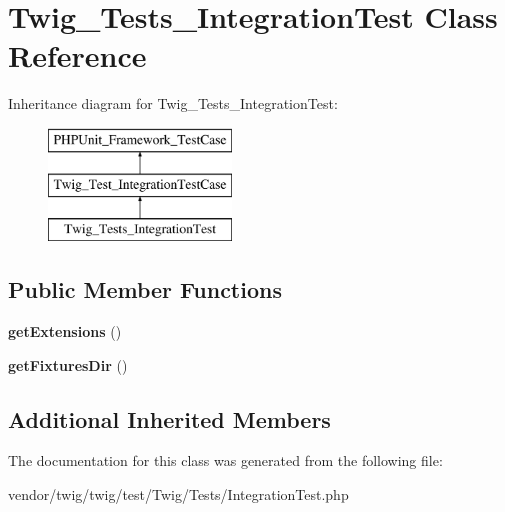 \hypertarget{classTwig__Tests__IntegrationTest}{}\section{Twig\+\_\+\+Tests\+\_\+\+Integration\+Test Class Reference}
\label{classTwig__Tests__IntegrationTest}
Inheritance diagram for Twig\+\_\+\+Tests\+\_\+\+Integration\+Test\+:\begin{figure}[H]
\begin{center}
\leavevmode
\includegraphics[height=3.000000cm]{classTwig__Tests__IntegrationTest}
\end{center}
\end{figure}
\subsection*{Public Member Functions}
\begin{DoxyCompactItemize}
\item 
{\bfseries get\+Extensions} ()\hypertarget{classTwig__Tests__IntegrationTest_abade25335a528983a8fda946b11cdae9}{}\label{classTwig__Tests__IntegrationTest_abade25335a528983a8fda946b11cdae9}

\item 
{\bfseries get\+Fixtures\+Dir} ()\hypertarget{classTwig__Tests__IntegrationTest_aad6ade943da0ac1e0108db0e256618b4}{}\label{classTwig__Tests__IntegrationTest_aad6ade943da0ac1e0108db0e256618b4}

\end{DoxyCompactItemize}
\subsection*{Additional Inherited Members}


The documentation for this class was generated from the following file\+:\begin{DoxyCompactItemize}
\item 
vendor/twig/twig/test/\+Twig/\+Tests/Integration\+Test.\+php\end{DoxyCompactItemize}
